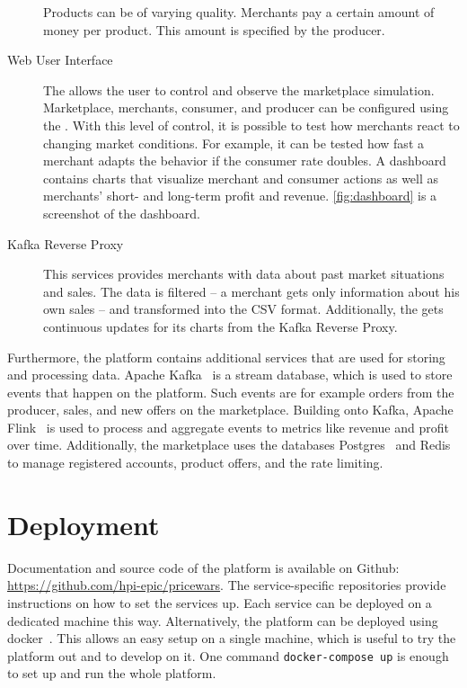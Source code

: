 \begin{description}
		Products can be of varying quality.
		Merchants pay a certain amount of money per product.
		This amount is specified by the producer.
	\item [Web User Interface]
		The \ui allows the user to control and observe the marketplace simulation.
		Marketplace, merchants, consumer, and producer can be configured using the \ui.
		With this level of control, it is possible to test how merchants react to changing market conditions.
		For example, it can be tested how fast a merchant adapts the behavior if the consumer rate doubles.
		A dashboard contains charts that visualize merchant and consumer actions as well as merchants' short- and long-term profit and revenue.
		\cref{fig:dashboard} is a screenshot of the dashboard.
	\item [Kafka Reverse Proxy]
		This services provides merchants with data about past market situations and sales.
		The data is filtered -- a merchant gets only information about his own sales -- and transformed into the CSV format.
		Additionally, the \ui gets continuous updates for its charts from the Kafka Reverse Proxy.
		
\end{description}

Furthermore, the \pricewars platform contains additional services that are used for storing and processing data.
Apache Kafka~\cite{garg2013apache} is a stream database, which is used to store events that happen on the platform. Such events are for example orders from the producer, sales, and new offers on the marketplace.
Building onto Kafka, Apache Flink~\cite{carbone2015apache} is used to process and aggregate events to metrics like revenue and profit over time.
Additionally, the marketplace uses the databases Postgres~\cite{postgres} and Redis~\cite{carlson2013redis} to manage registered accounts, product offers, and the rate limiting.

\section{Deployment}
Documentation and source code of the \pricewars platform is available on Github: \url{https://github.com/hpi-epic/pricewars}.
The service-specific repositories provide instructions on how to set the services up.
Each service can be deployed on a dedicated machine this way.
Alternatively, the \pricewars platform can be deployed using docker~\cite{Merkel:2014:DLL:2600239.2600241}.
This allows an easy setup on a single machine, which is useful to try the platform out and to develop on it.
One command \texttt{docker-compose up} is enough to set up and run the whole \pricewars platform.
